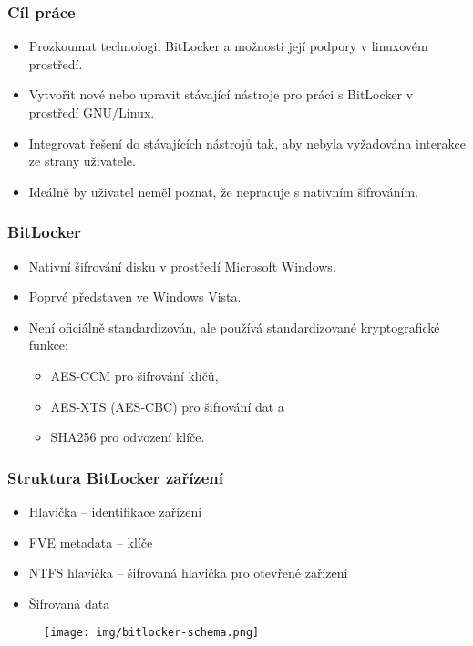\documentclass{beamer}
\begin{document}
\begin{frame}
	\frametitle{Cíl práce}
	\begin{block}{}
		\begin{itemize}
			\item Prozkoumat technologii BitLocker a možnosti její podpory v linuxovém prostředí.
			\item Vytvořit nové nebo upravit stávající nástroje pro práci s BitLocker v prostředí GNU/Linux.
			\item Integrovat řešení do stávajících nástrojů tak, aby nebyla vyžadována interakce ze strany uživatele.
			\item Ideálně by uživatel neměl poznat, že nepracuje s nativním šifrováním.
		\end{itemize}
	\end{block}

\end{frame}

\begin{frame}
	\frametitle{BitLocker}

	\begin{block}{}
		\begin{itemize}
			\item Nativní šifrování disku v prostředí Microsoft Windows.
			\item Poprvé představen ve Windows Vista.
			\item Není oficiálně standardizován, ale používá standardizované kryptografické funkce:
			
			\begin{itemize}
				\item AES-CCM pro šifrování klíčů,
				\item AES-XTS (AES-CBC) pro šifrování dat a
				\item SHA256 pro odvození klíče.
			\end{itemize}
		\end{itemize}
	\end{block}

\end{frame}

\begin{frame}
	\frametitle{Struktura BitLocker zařízení}

	\begin{block}{}
		\begin{itemize}
			\item Hlavička -- identifikace zařízení
			\item FVE metadata -- klíče
			\item NTFS hlavička -- šifrovaná hlavička pro otevřené zařízení
			\item Šifrovaná data
		\end{itemize}
	\end{block}
	
	\begin{figure}[ht!]
	\begin{center}
  	  \texttt{[image: img/bitlocker-schema.png]}
	\end{center}
	\end{figure}

\end{frame}
\end{document}

